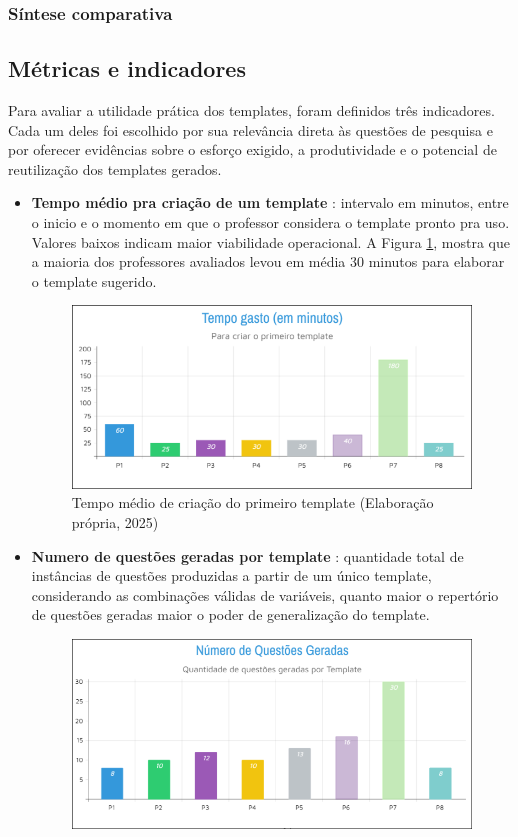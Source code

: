   \subsubsection{Síntese comparativa}



\subsection{Métricas e indicadores}

Para avaliar a utilidade prática dos templates, foram definidos três indicadores. Cada um deles foi escolhido por sua relevância direta às questões de pesquisa e por oferecer evidências sobre o esforço exigido, a produtividade e o potencial de reutilização dos templates gerados.
    \begin{itemize}
        \item \textbf{Tempo médio pra criação de um template} : intervalo em minutos, entre o inicio e o momento em que o professor considera o template pronto pra uso. Valores baixos indicam maior viabilidade operacional. A Figura \ref{fig:tempo-gasto}, mostra que a maioria dos professores avaliados levou em média 30 minutos para elaborar o template sugerido.
\begin{figure}[ht]
	\centering
	\includegraphics[width=16cm]{./imagens/capitulo8/tempo-gasto}
	\caption{Tempo médio de criação do primeiro template (Elaboração própria, 2025) }
	\label{fig:tempo-gasto}
\end{figure}
        \item \textbf{Numero de questões geradas por template} : quantidade total de instâncias de questões produzidas a partir de um único template, considerando as combinações válidas de variáveis, quanto maior o repertório de questões geradas maior o poder de generalização do template.
\begin{figure}[ht]
	\centering
	\includegraphics[width=16cm]{./imagens/capitulo8/questoes-geradas}

\end{figure}
\end{itemize}

